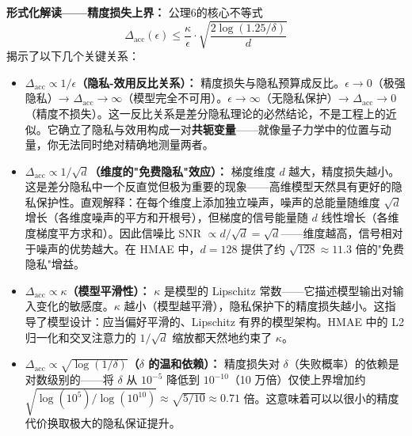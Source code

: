 \documentclass[11pt,a4paper]{ctexart}
\theoremstyle{remark}
\begin{document}
\textbf{形式化解读——精度损失上界：} 公理6的核心不等式
\[
\Delta_{\text{acc}}(\epsilon) \leq \frac{\kappa}{\epsilon} \cdot \sqrt{\frac{2\log(1.25/\delta)}{d}}
\]
揭示了以下几个关键关系：
\begin{itemize}[nosep]
\item \textbf{$\Delta_{\text{acc}} \propto 1/\epsilon$（隐私-效用反比关系）：} 精度损失与隐私预算成反比。$\epsilon \to 0$（极强隐私）→ $\Delta_{\text{acc}} \to \infty$（模型完全不可用）。$\epsilon \to \infty$（无隐私保护）→ $\Delta_{\text{acc}} \to 0$（精度不损失）。这一反比关系是差分隐私理论的必然结论，不是工程上的近似。它确立了隐私与效用构成一对\textbf{共轭变量}——就像量子力学中的位置与动量，你无法同时绝对精确地测量两者。
\item \textbf{$\Delta_{\text{acc}} \propto 1/\sqrt{d}$（维度的"免费隐私"效应）：} 梯度维度 $d$ 越大，精度损失越小。这是差分隐私中一个反直觉但极为重要的现象——高维模型天然具有更好的隐私保护性。直观解释：在每个维度上添加独立噪声，噪声的总能量随维度 $\sqrt{d}$ 增长（各维度噪声的平方和开根号），但梯度的信号能量随 $d$ 线性增长（各维度梯度平方求和）。因此信噪比 SNR $\propto d / \sqrt{d} = \sqrt{d}$——维度越高，信号相对于噪声的优势越大。在 HMAE 中，$d=128$ 提供了约 $\sqrt{128} \approx 11.3$ 倍的"免费隐私"增益。
\item \textbf{$\Delta_{\text{acc}} \propto \kappa$（模型平滑性）：} $\kappa$ 是模型的 Lipschitz 常数——它描述模型输出对输入变化的敏感度。$\kappa$ 越小（模型越平滑），隐私保护下的精度损失越小。这指导了模型设计：应当偏好平滑的、Lipschitz 有界的模型架构。HMAE 中的 L2 归一化和交叉注意力的 $1/\sqrt{d}$ 缩放都天然地约束了 $\kappa$。
\item \textbf{$\Delta_{\text{acc}} \propto \sqrt{\log(1/\delta)}$（$\delta$ 的温和依赖）：} 精度损失对 $\delta$（失败概率）的依赖是对数级别的——将 $\delta$ 从 $10^{-5}$ 降低到 $10^{-10}$（10 万倍）仅使上界增加约 $\sqrt{\log(10^{5}) / \log(10^{10})} \approx \sqrt{5/10} \approx 0.71$ 倍。这意味着可以以很小的精度代价换取极大的隐私保证提升。
\end{itemize}
\end{document}
